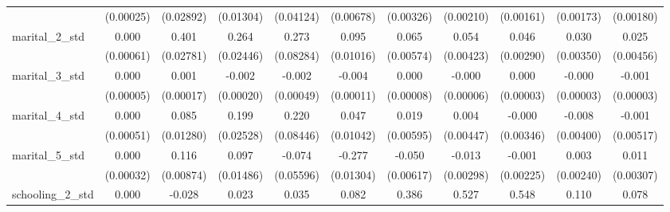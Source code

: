 {\begin{tabular}{l*{10}{c}}
                    &   (0.00025)         &   (0.02892)         &   (0.01304)         &   (0.04124)         &   (0.00678)         &   (0.00326)         &   (0.00210)         &   (0.00161)         &   (0.00173)         &   (0.00180)         \\
marital\_2\_std       &       0.000         &       0.401\sym{***}&       0.264\sym{***}&       0.273\sym{***}&       0.095\sym{***}&       0.065\sym{***}&       0.054\sym{***}&       0.046\sym{***}&       0.030\sym{***}&       0.025\sym{***}\\
                    &   (0.00061)         &   (0.02781)         &   (0.02446)         &   (0.08284)         &   (0.01016)         &   (0.00574)         &   (0.00423)         &   (0.00290)         &   (0.00350)         &   (0.00456)         \\
marital\_3\_std       &       0.000         &       0.001\sym{***}&      -0.002\sym{***}&      -0.002\sym{***}&      -0.004\sym{***}&       0.000\sym{*}  &      -0.000         &       0.000         &      -0.000\sym{***}&      -0.001\sym{***}\\
                    &   (0.00005)         &   (0.00017)         &   (0.00020)         &   (0.00049)         &   (0.00011)         &   (0.00008)         &   (0.00006)         &   (0.00003)         &   (0.00003)         &   (0.00003)         \\
marital\_4\_std       &       0.000         &       0.085\sym{***}&       0.199\sym{***}&       0.220\sym{**} &       0.047\sym{***}&       0.019\sym{**} &       0.004         &      -0.000         &      -0.008\sym{*}  &      -0.001         \\
                    &   (0.00051)         &   (0.01280)         &   (0.02528)         &   (0.08446)         &   (0.01042)         &   (0.00595)         &   (0.00447)         &   (0.00346)         &   (0.00400)         &   (0.00517)         \\
marital\_5\_std       &       0.000         &       0.116\sym{***}&       0.097\sym{***}&      -0.074         &      -0.277\sym{***}&      -0.050\sym{***}&      -0.013\sym{***}&      -0.001         &       0.003         &       0.011\sym{***}\\
                    &   (0.00032)         &   (0.00874)         &   (0.01486)         &   (0.05596)         &   (0.01304)         &   (0.00617)         &   (0.00298)         &   (0.00225)         &   (0.00240)         &   (0.00307)         \\
schooling\_2\_std     &       0.000         &      -0.028         &       0.023         &       0.035\sym{***}&       0.082\sym{***}&       0.386\sym{***}&       0.527\sym{***}&       0.548\sym{***}&       0.110\sym{***}&       0.078\sym{***}\\

\end{tabular}}
